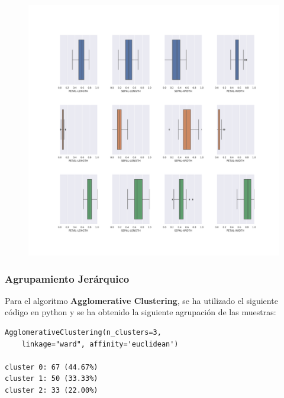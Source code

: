 \documentclass[spanish]{beamer}
\begin{document}
\begin{frame}
\begin{figure}[h]
\centering
\includegraphics[scale=0.24]{dani/boxplotK-MeansIRIS.png}
\end{figure}
\end{frame}

\begin{frame}[fragile]
\frametitle{Agrupamiento Jerárquico}
Para el algoritmo \textbf{Agglomerative Clustering}, se ha utilizado el siguiente código en python y se ha obtenido la siguiente agrupación de las muestras:\break
\begin{lstlisting}
AgglomerativeClustering(n_clusters=3, 
	linkage="ward", affinity='euclidean')

cluster 0: 67 (44.67%)
cluster 1: 50 (33.33%)
cluster 2: 33 (22.00%)
\end{lstlisting}
\end{frame}
\end{document}
